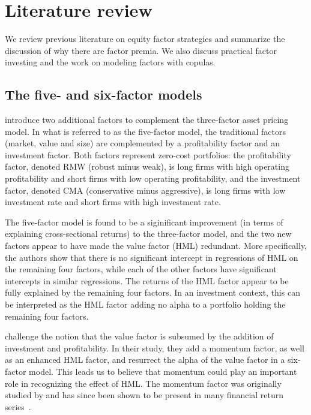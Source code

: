 \section{Literature review}
\label{sec:literature}

We review previous literature on equity factor strategies and summarize the discussion of why there are factor premia. We also discuss practical factor investing and the work on modeling factors with copulas.

\subsection{The five- and six-factor models}

\textcite{FF2015} introduce two additional factors to complement the \textcite{FamaFrench1993} three-factor asset pricing model. In what is referred to as the five-factor model, the traditional factors (market, value and size) are complemented by a profitability factor and an investment factor. Both factors represent zero-cost portfolios: the profitability factor, denoted RMW (robust minus weak), is long firms with high operating profitability and short firms with low operating profitability, and the investment factor, denoted CMA (conservative minus aggressive), is long firms with low investment rate and short firms with high investment rate. 

The five-factor model is found to be a siginificant improvement (in terms of explaining cross-sectional returns) to the three-factor model, and the two new factors appear to have made the value factor (HML) redundant. More specifically, the authors show that there is no significant intercept in regressions of HML on the remaining four factors, while each of the other factors have significant intercepts in similar regressions. The returns of the HML factor appear to be fully explained by the remaining four factors. In an investment context, this can be interpreted as the HML factor adding no alpha to a portfolio holding the remaining four factors.

\textcite{Asness2015} challenge the notion that the value factor is subsumed by the addition of investment and profitability. In their study, they add a momentum factor, as well as an enhanced HML factor, and resurrect the alpha of the value factor in a six-factor model. This leads us to believe that momentum could play an important role in recognizing the effect of HML. The momentum factor was originally studied by \textcite{JegadeeshTitman1993} and has since been shown to be present in many financial return series~\autocite{AsnessMoskovitzPedersen2013}.

